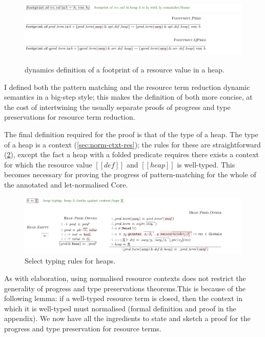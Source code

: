 \begin{figure}
    \includegraphics{figures/kernel-dynamics-footprint-1}
    \includegraphics{figures/kernel-dynamics-footprint-2}
    \caption{ dynamics definition of a footprint of a resource
        value in a heap.}\label{fig:kernel-footprint}
\end{figure}

I defined both the pattern matching and the resource term reduction dynamic
semantics in a big-step style; this makes the definition of both more concise,
at the cost of intertwining the usually separate proofs of progress and type
preservations for resource term reduction.

The final definition required for the proof is that of the type of a heap. The
type of a heap is a  context
(\cref{sec:norm-ctxt-res}); the rules for these are straightforward
(\cref{fig:kernel-heap-typing}), except the fact a heap with a folded predicate
requires there exists a context for which the resource value $[[ def ]]$ and
$[[ heap ]]$ is well-typed. This becomes necessary for proving the progress of
pattern-matching for the whole of the annotated and let-normalised Core.

\begin{figure}
    \includegraphics{figures/kernel-heap-typing}
    \caption{Select typing rules for heaps.}\label{fig:kernel-heap-typing}
\end{figure}

As with elaboration, using normalised resource contexts does not restrict the
generality of progress and type preservations theorems.This is because of the
following lemma: if a well-typed resource term is closed, then the context in
which it is well-typed must normalised (formal definition and proof in the
appendix). We now have all the ingredients to state and sketch a proof for the
progress and type preservation for resource terms.

